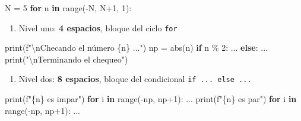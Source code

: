 \documentclass[
  spanish,
  letterpaper,
]{scrbook}
\newenvironment{Shaded}{\begin{snugshade}}{\end{snugshade}}
\newcommand{\BuiltInTok}[1]{\textcolor[rgb]{0.00,0.23,0.31}{#1}}
\newcommand{\CharTok}[1]{\textcolor[rgb]{0.13,0.47,0.30}{#1}}
\newcommand{\ControlFlowTok}[1]{\textcolor[rgb]{0.00,0.23,0.31}{\textbf{#1}}}
\newcommand{\DecValTok}[1]{\textcolor[rgb]{0.68,0.00,0.00}{#1}}
\newcommand{\KeywordTok}[1]{\textcolor[rgb]{0.00,0.23,0.31}{\textbf{#1}}}
\newcommand{\NormalTok}[1]{\textcolor[rgb]{0.00,0.23,0.31}{#1}}
\newcommand{\OperatorTok}[1]{\textcolor[rgb]{0.37,0.37,0.37}{#1}}
\newcommand{\SpecialCharTok}[1]{\textcolor[rgb]{0.37,0.37,0.37}{#1}}
\newcommand{\SpecialStringTok}[1]{\textcolor[rgb]{0.13,0.47,0.30}{#1}}
\newcommand{\StringTok}[1]{\textcolor[rgb]{0.13,0.47,0.30}{#1}}
\providecommand{\tightlist}{%
  \setlength{\itemsep}{0pt}\setlength{\parskip}{0pt}}
\theoremstyle{definition}
\theoremstyle{remark}
\begin{document}
\begin{Shaded}
\begin{Highlighting}[]
\NormalTok{N }\OperatorTok{=} \DecValTok{5}
\ControlFlowTok{for}\NormalTok{ n }\KeywordTok{in} \BuiltInTok{range}\NormalTok{(}\OperatorTok{{-}}\NormalTok{N, N}\OperatorTok{+}\DecValTok{1}\NormalTok{, }\DecValTok{1}\NormalTok{): }
\end{Highlighting}
\end{Shaded}

\begin{enumerate}
\def\labelenumi{\arabic{enumi}.}
\setcounter{enumi}{1}
\tightlist
\item
  Nivel uno: \textbf{4 espacios}, bloque del ciclo \texttt{for}
\end{enumerate}

\begin{Shaded}
\begin{Highlighting}[]
    \BuiltInTok{print}\NormalTok{(}\SpecialStringTok{f"}\CharTok{\textbackslash{}n}\SpecialStringTok{Checando el número }\SpecialCharTok{\{}\NormalTok{n}\SpecialCharTok{\}}\SpecialStringTok{ ..."}\NormalTok{)}
\NormalTok{    np }\OperatorTok{=} \BuiltInTok{abs}\NormalTok{(n)}
    \ControlFlowTok{if}\NormalTok{ n }\OperatorTok{\%} \DecValTok{2}\NormalTok{:}
\NormalTok{        ...}
    \ControlFlowTok{else}\NormalTok{:}
\NormalTok{        ...}
    \BuiltInTok{print}\NormalTok{(}\StringTok{"}\CharTok{\textbackslash{}n}\StringTok{Terminando el chequeo"}\NormalTok{)}
\end{Highlighting}
\end{Shaded}

\begin{enumerate}
\def\labelenumi{\arabic{enumi}.}
\setcounter{enumi}{2}
\tightlist
\item
  Nivel dos: \textbf{8 espacios}, bloque del condicional
  \texttt{if\ ...\ else\ ...}
\end{enumerate}

\begin{Shaded}
\begin{Highlighting}[]
        \BuiltInTok{print}\NormalTok{(}\SpecialStringTok{f"}\SpecialCharTok{\{}\NormalTok{n}\SpecialCharTok{\}}\SpecialStringTok{ es impar"}\NormalTok{)}
        \ControlFlowTok{for}\NormalTok{ i }\KeywordTok{in} \BuiltInTok{range}\NormalTok{(}\OperatorTok{{-}}\NormalTok{np, np}\OperatorTok{+}\DecValTok{1}\NormalTok{):}
\NormalTok{        ...}
        \BuiltInTok{print}\NormalTok{(}\SpecialStringTok{f"}\SpecialCharTok{\{}\NormalTok{n}\SpecialCharTok{\}}\SpecialStringTok{ es par"}\NormalTok{)}
        \ControlFlowTok{for}\NormalTok{ i }\KeywordTok{in} \BuiltInTok{range}\NormalTok{(}\OperatorTok{{-}}\NormalTok{np, np}\OperatorTok{+}\DecValTok{1}\NormalTok{):}
\NormalTok{        ...}
\end{Highlighting}
\end{Shaded}
\end{document}
